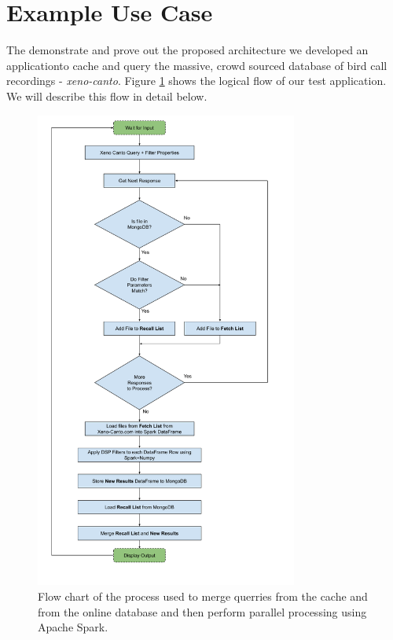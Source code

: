 \documentclass[conference,twoside]{IEEEtran}
\begin{document}
\section{Example Use Case}
The demonstrate and prove out the proposed architecture we developed an application\footnotemark to cache and query the massive, crowd sourced database of bird call recordings - \textit{xeno-canto}. Figure \ref{fig:flow} shows the logical flow of our test application. We will describe this flow in detail below.
\begin{figure}
  \centering
  \includegraphics[width=3.4in]{project_flow_chart}
  \caption{Flow chart of the process used to merge querries from the cache and from the online database and then perform parallel processing using Apache Spark.}
  \label{fig:flow}
\end{figure}



\end{document}
